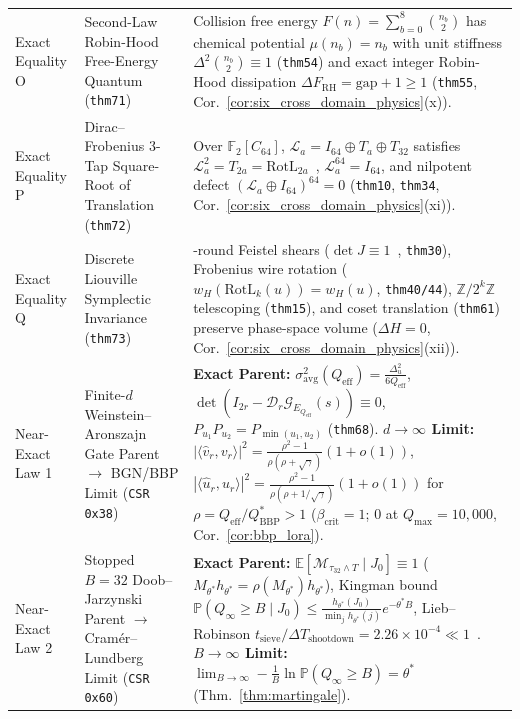 \documentclass[11pt,letterpaper]{article}
\theoremstyle{spectralthm}
\begin{document}
\begin{table}[!htp]
{\begin{minipage}{1.14\textwidth}
\begin{tabularx}{\textwidth}{@{}>{\bfseries\raggedright\arraybackslash}p{2.05cm} >{\raggedright\arraybackslash}p{3.40cm} >{\raggedright\arraybackslash}X@{}}
\addlinespace[1.2pt]
Exact Equality O & Second-Law Robin-Hood Free-Energy Quantum (\texttt{thm71}) & Collision free energy $F(n)=\sum_{b=0}^8\binom{n_b}{2}$ has chemical potential $\mu(n_b)=n_b$ with unit stiffness $\Delta^2\binom{n_b}{2}\equiv 1$ (\texttt{thm54}) and exact integer Robin-Hood dissipation $\Delta F_{\mathrm{RH}} = \mathrm{gap}+1 \ge 1$ (\texttt{thm55}, Cor.~\ref{cor:six_cross_domain_physics}(x)). \\
\addlinespace[1.2pt]
Exact Equality P & Dirac--Frobenius 3-Tap Square-Root of Translation (\texttt{thm72}) & Over $\mathbb{F}_2[C_{64}]$, $\mathcal{L}_a = I_{64}\oplus T_a\oplus T_{32}$ satisfies $\mathcal{L}_a^2 = T_{2a} = \mathrm{RotL}_{2a}$~\cite{dirac1928quantum}, $\mathcal{L}_a^{64} = I_{64}$, and nilpotent defect $(\mathcal{L}_a \oplus I_{64})^{64} = 0$ (\texttt{thm10}, \texttt{thm34}, Cor.~\ref{cor:six_cross_domain_physics}(xi)). \\
\addlinespace[1.2pt]
Exact Equality Q & Discrete Liouville Symplectic Invariance (\texttt{thm73}) & 6-round Feistel shears ($\det J \equiv 1$~\cite{dirac1928quantum, liouville1838note}, \texttt{thm30}), Frobenius wire rotation ($w_H(\mathrm{RotL}_k(u))=w_H(u)$, \texttt{thm40/44}), $\mathbb{Z}/2^k\mathbb{Z}$ telescoping (\texttt{thm15}), and coset translation (\texttt{thm61}) preserve phase-space volume ($\Delta H = 0$, Cor.~\ref{cor:six_cross_domain_physics}(xii)). \\
\midrule
Near-Exact Law 1 & Finite-$d$ Weinstein--Aronszajn Gate Parent $\to$ BGN/BBP Limit (\texttt{CSR 0x38}) & \textbf{Exact Parent:} $\sigma_{\mathrm{avg}}^2(Q_{\mathrm{eff}})=\frac{\Delta_u^2}{6Q_{\mathrm{eff}}}$, $\det(I_{2r}-\mathcal{D}_r\mathcal{G}_{E_{Q_{\mathrm{eff}}}}(s))\equiv 0$, $P_{u_1}P_{u_2}=P_{\min(u_1,u_2)}$ (\texttt{thm68}). \textbf{$d\to\infty$ Limit:} $|\langle\hat{v}_r,v_r\rangle|^2=\frac{\rho^2-1}{\rho(\rho+\sqrt{\gamma})}(1+o(1))$, $|\langle\hat{u}_r,u_r\rangle|^2=\frac{\rho^2-1}{\rho(\rho+1/\sqrt{\gamma})}(1+o(1))$ for $\rho=Q_{\mathrm{eff}}/Q_{\mathrm{BBP}}^*>1$ ($\beta_{\mathrm{crit}}=1$; $0$ at $Q_{\max}=10{,}000$, Cor.~\ref{cor:bbp_lora}). \\
\addlinespace[1.2pt]
Near-Exact Law 2 & Stopped $B=32$ Doob--Jarzynski Parent $\to$ Cram\'{e}r--Lundberg Limit (\texttt{CSR 0x60}) & \textbf{Exact Parent:} $\mathbb{E}[\mathcal{M}_{\tau_{32}\wedge T}\mid J_0]\equiv 1$ ($M_{\theta^*}h_{\theta^*}=\rho(M_{\theta^*})h_{\theta^*}$), Kingman bound $\mathbb{P}(Q_\infty\ge B\mid J_0)\le\frac{h_{\theta^*}(J_0)}{\min_j h_{\theta^*}(j)}e^{-\theta^* B}$, Lieb--Robinson $t_{\mathrm{sieve}}/\Delta T_{\mathrm{shootdown}}=2.26\times 10^{-4}\ll 1$~\cite{mckean1967curvature}. \textbf{$B\to\infty$ Limit:} $\lim_{B\to\infty}-\frac{1}{B}\ln\mathbb{P}(Q_\infty\ge B)=\theta^*$ (Thm.~\ref{thm:martingale}). \\

\end{tabularx}
\end{minipage}}
\end{table}
\end{document}
